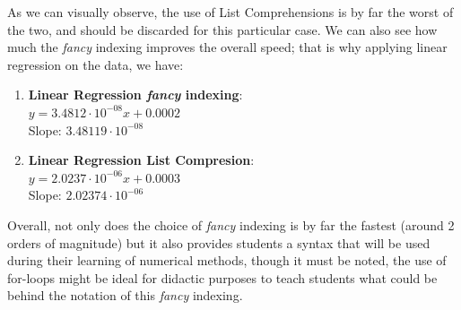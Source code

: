 As we can visually observe, the use of List Comprehensions is by far the worst of the two, and should be discarded for this particular case. We can also see how much the \textit{fancy} indexing improves the overall speed; that is why applying linear regression on the data, we have:
\begin{enumerate}
    \item \textbf{Linear Regression \textit{fancy} indexing}: \\
        $y = 3.4812\cdot10^{-08}x + 0.0002$ \\
        Slope: $3.48119\cdot10^{-08}$
    \item \textbf{Linear Regression List Compresion}: \\
        $y = 2.0237\cdot10^{-06}x + 0.0003$ \\
        Slope: $2.02374\cdot10^{-06}$
\end{enumerate}

Overall, not only does the choice of \textit{fancy} indexing is by far the fastest (around 2 orders of magnitude) but it also provides students a syntax that will be used during their learning of numerical methods, though it must be noted, the use of for-loops might be ideal for didactic purposes to teach students what could be behind the notation of this \textit{fancy} indexing.





